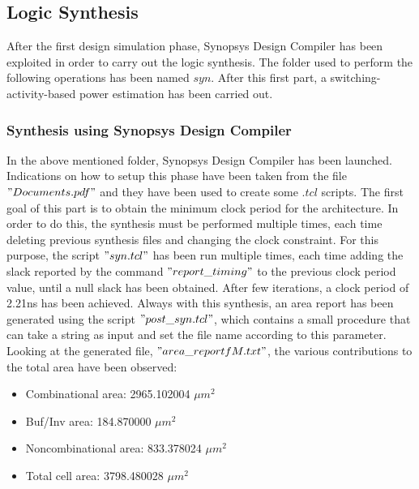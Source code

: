 \subsection{Logic Synthesis}
After the first design simulation phase, Synopsys Design Compiler has been exploited in order to carry out the logic synthesis. The folder used to perform the following operations has been named $syn$. After this first part, a switching-activity-based power estimation has been carried out.
\subsubsection{Synthesis using Synopsys Design Compiler}
In the above mentioned folder, Synopsys Design Compiler has been launched. Indications on how to setup this phase have been taken from the file $"Documents.pdf"$ and they have been used to create some $.tcl$ scripts. 
\newline
\newline
The first goal of this part is to obtain the minimum clock period for the architecture. In order to do this, the synthesis must be performed multiple times, each time deleting previous synthesis files and changing the clock constraint. For this purpose, the script $"syn.tcl"$ has been run multiple times, each time adding the slack reported by the command $"report\_timing"$ to the previous clock period value, until a null slack has been obtained. 
\newline
\newline
After few iterations, a clock period of 2.21\si{\nano\second} has been achieved. Always with this synthesis, an area report has been generated using the script $"post\_syn.tcl"$, which contains a small procedure that can take a string as input and set the file name according to this parameter.
Looking at the generated file, $"area\_reportfM.txt"$, the various contributions to the total area have been observed:


\begin{itemize}
\item Combinational area:               2965.102004 $\mu m^{2}$
\item Buf/Inv area:                      184.870000 $\mu m^{2}$
\item Noncombinational area:             833.378024 $\mu m^{2}$
\item Total cell area:                  3798.480028 $\mu m^{2}$
\end{itemize}

